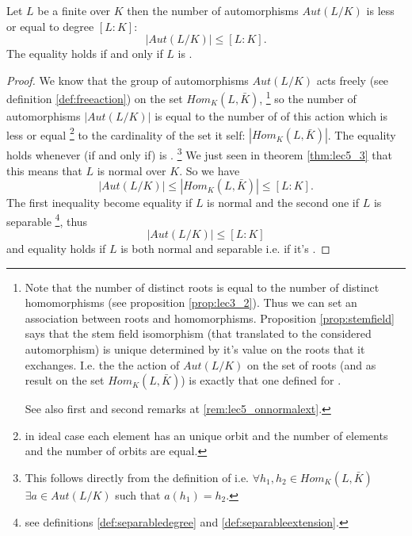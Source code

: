 \begin{theorem}
  Let $L$ be a finite over $K$ then the number of automorphisms
  $Aut\left(L/K\right)$ is less or equal to degree
  $\left[L:K\right]$:
  \[
  \left|Aut\left(L/K\right)\right| \le \left[L:K\right].
  \]
  The equality holds if and only if $L$ is
  .
  \label{thm:lec5_4}
  \begin{proof}
    We know that the group of automorphisms $Aut\left(L/K\right)$ acts
    freely (see definition \ref{def:freeaction}) on the set
    $Hom_K\left(L, \bar{K}\right)$,
    \footnote{
      Note that the number of distinct roots is equal to the number of
      distinct homomorphisms (see proposition \ref{prop:lec3_2}). Thus
      we can set an association between 
      roots and homomorphisms. Proposition \ref{prop:stemfield}
      says that the stem 
      field isomorphism (that translated to the considered
      automorphism) is unique determined by it's value on the roots that
      it exchanges. I.e. the the action of $Aut\left(L/K\right)$ on
      the set of roots (and as result on the set $Hom_K\left(L,
      \bar{K}\right)$) is exactly that one defined for 
      .

      See also first and second remarks at \ref{rem:lec5_onnormalext}.
    }
    so the number of 
    automorphisms $\left|Aut\left(L/K\right)\right|$ is equal to the
    number of  of this action which is less or
    equal
    \footnote{
      in ideal case each element has an unique orbit and the number of
      elements and the number of orbits are equal.
    }
    to the cardinality of the set it self:
    $\left|Hom_K\left(L, \bar{K}\right)\right|$. The equality holds
    whenever (if and only if)  is
    .
    \footnote{
      This follows directly from the definition of
       i.e. $\forall h_1, h_2 \in
      Hom_K\left(L, \bar{K}\right)$ $\exists a \in
      Aut\left(L/K\right)$  such that $a(h_1) = h_2$.
    }
    We just seen in 
    theorem \ref{thm:lec5_3} that this means that $L$ is normal over
    $K$. So we have
    \[
    \left|Aut\left(L/K\right)\right| \le
    \left|Hom_K\left(L, \bar{K}\right)\right| \le
    \left[L:K\right].
    \]
    The first inequality become equality if $L$ is normal and the
    second one if $L$ is separable
    \footnote{
      see definitions \ref{def:separabledegree} and
      \ref{def:separableextension}. 
    }, thus
    \[
    \left|Aut\left(L/K\right)\right| \le \left[L:K\right]
    \]
    and equality holds if $L$ is both normal and separable i.e. if
    it's .
  \end{proof}
\end{theorem}

